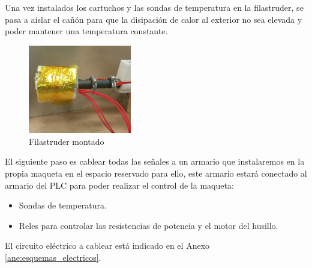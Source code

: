 Una vez instalados los cartuchos y las sondas de temperatura en la filastruder, se pasa a aislar el cañón para que la disipación de calor al exterior no sea elevada y poder mantener una temperatura constante.

    \begin{figure}[H]
            \centering
            \includegraphics[width=0.4\textwidth]{images/filaextruder/IMG_20150814_132929.jpg}
            \caption{Filastruder montado}
            \label{fig:fila_montaje4}
    \end{figure}

El siguiente paso es cablear todas las señales a un armario que instalaremos en la propia maqueta en el espacio reservado para ello, este armario estará conectado al armario del PLC para poder realizar el control de la maqueta:

    \begin{itemize}
    	\item Sondas de temperatura.
    	\item Reles para controlar las resistencias de potencia y el motor del husillo.
    \end{itemize}

El circuito eléctrico a cablear está indicado en el Anexo \ref{ane:esquemas_electricos}.

